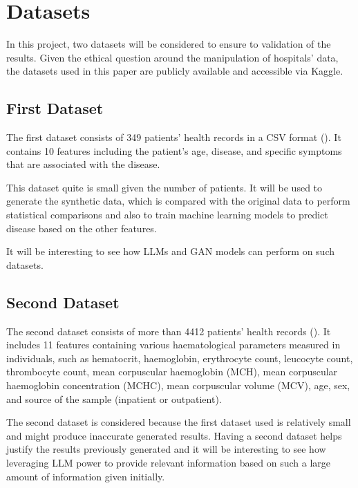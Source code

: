 \chapter{Datasets}
\label{chap:Datasets}

In this project, two datasets will be considered to ensure to validation of the results.
Given the ethical question around the manipulation of hospitals' data, the datasets used in this paper are publicly available and accessible via Kaggle.

\section{First Dataset}

The first dataset consists of 349 patients' health records in a CSV format (\cite{uom190346a_disease_symptoms_2021}). It contains 10 features including the patient's age, disease, and specific symptoms that are associated with the disease. 


This dataset quite is small given the number of patients. It will be used to generate the synthetic data, which is compared with the original data to perform statistical comparisons and also to train machine learning models to predict disease based on the other features.

It will be interesting to see how LLMs and GAN models can perform on such datasets.



\section{Second Dataset}

The second dataset consists of more than 4412 patients' health records (\cite{palivela_patient_treatment_2021}). It includes 11 features containing various haematological parameters measured in individuals, such as hematocrit, haemoglobin, erythrocyte count, leucocyte count, thrombocyte count, mean corpuscular haemoglobin (MCH), mean corpuscular haemoglobin concentration (MCHC), mean corpuscular volume (MCV), age, sex, and source of the sample (inpatient or outpatient). 

The second dataset is considered because the first dataset used is relatively small and might produce inaccurate generated results. Having a second dataset helps justify the results previously generated and it will be interesting to see how leveraging LLM power to provide relevant information based on such a large amount of information given initially.